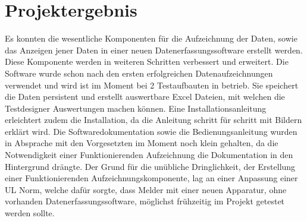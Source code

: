 \documentclass[10pt]{scrartcl}
\begin{document}
\section{Projektergebnis}
Es konnten die wesentliche Komponenten für die Aufzeichnung der Daten, sowie das Anzeigen jener Daten in einer neuen Datenerfassungssoftware erstellt werden. Diese Komponente werden in weiteren Schritten verbessert und erweitert. Die Software wurde schon nach den ersten erfolgreichen Datenaufzeichnungen verwendet und wird ist im Moment bei 2 Testaufbauten in betrieb. Sie speichert die Daten persistent und erstellt auswertbare Excel Dateien, mit welchen die Testdesigner Auswertungen machen können.
Eine Installationsanleitung erleichtert zudem die Installation, da die Anleitung schritt für schritt mit Bildern erklärt wird. Die Softwaredokumentation sowie die Bedienungsanleitung wurden in Absprache mit den Vorgesetzten im Moment noch klein gehalten, da die Notwendigkeit einer Funktionierenden Aufzeichnung die Dokumentation in den Hintergrund drängte. Der Grund für die unübliche Dringlichkeit, der Erstellung einer Funktionierenden Aufzeichnungskomponente, lag an einer Anpassung einer UL Norm, welche dafür sorgte, dass Melder mit einer neuen Apparatur, ohne vorhanden Datenerfassungssoftware, möglichst frühzeitig im Projekt getestet werden sollte.
\end{document}
